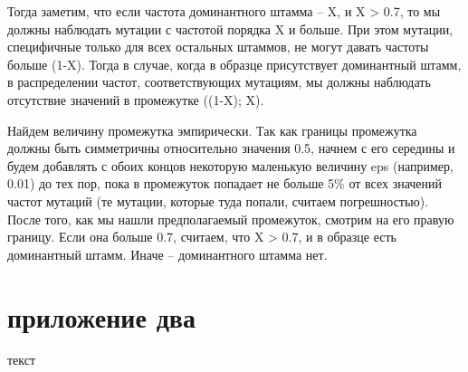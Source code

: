 \documentclass{spbau-diploma}
\begin{document}
Тогда заметим, что если частота доминантного штамма – X, и X > 0.7, то мы должны наблюдать мутации с частотой порядка X и больше. При этом мутации, специфичные только для всех остальных штаммов, не могут давать частоты больше (1-X). Тогда в случае, когда в образце присутствует доминантный штамм, в распределении частот, соответствующих мутациям, мы должны наблюдать отсутствие значений в промежутке ((1-X); X).

Найдем величину промежутка эмпирически. Так как границы промежутка должны быть симметричны относительно значения 0.5, начнем с его середины и будем добавлять с обоих концов некоторую маленькую величину eps (например, 0.01) до тех пор, пока в промежуток попадает не больше 5\% от всех значений частот мутаций (те мутации, которые туда попали, считаем погрешностью). После того, как мы нашли предполагаемый промежуток, смотрим на его правую границу. Если она больше 0.7, считаем, что X > 0.7, и в образце есть доминантный штамм. Иначе – доминантного штамма нет.


\section{приложение два}
текст
\end{document}
